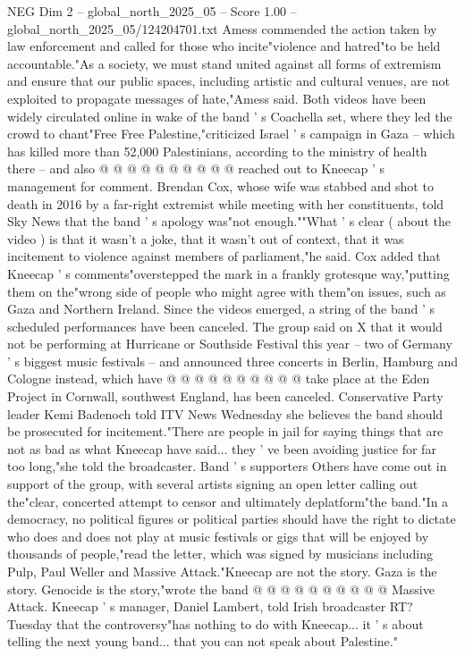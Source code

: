 \begin{textsample}{NEG Dim 2 – global\_north\_2025\_05 – Score 1.00 – global\_north\_2025\_05/124204701.txt}
Amess commended the action taken by law enforcement and called for those who incite"violence and hatred"to be held accountable."As a society, we must stand united against all forms of extremism and ensure that our public spaces, including artistic and cultural venues, are not exploited to propagate messages of hate,"Amess said.
Both videos have been widely circulated online in wake of the band ' s Coachella set, where they led the crowd to chant"Free Free Palestine,"criticized Israel ' s campaign in Gaza -- which has killed more than 52,000 Palestinians, according to the ministry of health there -- and also @ @ @ @ @ @ @ @ @ @ reached out to Kneecap ' s management for comment.
Brendan Cox, whose wife was stabbed and shot to death in 2016 by a far-right extremist while meeting with her constituents, told Sky News that the band ' s apology was"not enough.""What ' s clear ( about the video ) is that it wasn't a joke, that it wasn't out of context, that it was incitement to violence against members of parliament,"he said.
Cox added that Kneecap ' s comments"overstepped the mark in a frankly grotesque way,"putting them on the"wrong side of people who might agree with them"on issues, such as Gaza and Northern Ireland.
Since the videos emerged, a string of the band ' s scheduled performances have been canceled.
The group said on X that it would not be performing at Hurricane or Southside Festival this year -- two of Germany ' s biggest music festivals -- and announced three concerts in Berlin, Hamburg and Cologne instead, which have @ @ @ @ @ @ @ @ @ @ take place at the Eden Project in Cornwall, southwest England, has been canceled.
Conservative Party leader Kemi Badenoch told ITV News Wednesday she believes the band should be prosecuted for incitement."There are people in jail for saying things that are not as bad as what Kneecap have said... they ' ve been avoiding justice for far too long,"she told the broadcaster.
Band ' s supporters Others have come out in support of the group, with several artists signing an open letter calling out the"clear, concerted attempt to censor and ultimately deplatform"the band."In a democracy, no political figures or political parties should have the right to dictate who does and does not play at music festivals or gigs that will be enjoyed by thousands of people,"read the letter, which was signed by musicians including Pulp, Paul Weller and Massive Attack."Kneecap are not the story.
Gaza is the story.
Genocide is the story,"wrote the band @ @ @ @ @ @ @ @ @ @ Massive Attack.
Kneecap ' s manager, Daniel Lambert, told Irish broadcaster RT?
Tuesday that the controversy"has nothing to do with Kneecap... it ' s about telling the next young band... that you can not speak about Palestine."

\end{textsample}
